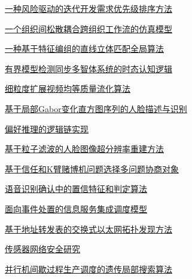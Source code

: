 \documentclass[a4paper]{article}
\begin{document}
\href{http://www.jos.org.cn/ch/reader/download_pdf.aspx?file_no=20061205&year_id=2006&quarter_id=12&falg=1}{一种风险驱动的迭代开发需求优先级排序方法}

\href{http://www.jos.org.cn/ch/reader/download_pdf.aspx?file_no=20061206&year_id=2006&quarter_id=12&falg=1}{一个组织间松散耦合跨组织工作流的仿真模型}

\href{http://www.jos.org.cn/ch/reader/download_pdf.aspx?file_no=20061207&year_id=2006&quarter_id=12&falg=1}{一种基于特征编组的直线立体匹配全局算法}

\href{http://www.jos.org.cn/ch/reader/download_pdf.aspx?file_no=20061208&year_id=2006&quarter_id=12&falg=1}{有界模型检测同步多智体系统的时态认知逻辑}

\href{http://www.jos.org.cn/ch/reader/download_pdf.aspx?file_no=20061209&year_id=2006&quarter_id=12&falg=1}{细粒度扩展视频均等质量流化算法}

\href{http://www.jos.org.cn/ch/reader/download_pdf.aspx?file_no=20061210&year_id=2006&quarter_id=12&falg=1}{基于局部Gabor变化直方图序列的人脸描述与识别}

\href{http://www.jos.org.cn/ch/reader/download_pdf.aspx?file_no=20061211&year_id=2006&quarter_id=12&falg=1}{偏好推理的逻辑链实现}

\href{http://www.jos.org.cn/ch/reader/download_pdf.aspx?file_no=20061212&year_id=2006&quarter_id=12&falg=1}{基于粒子滤波的人脸图像超分辨率重建方法}

\href{http://www.jos.org.cn/ch/reader/download_pdf.aspx?file_no=20061213&year_id=2006&quarter_id=12&falg=1}{基于信任和K臂赌博机问题选择多问题协商对象}

\href{http://www.jos.org.cn/ch/reader/download_pdf.aspx?file_no=20061214&year_id=2006&quarter_id=12&falg=1}{语音识别确认中的置信特征和判定算法}

\href{http://www.jos.org.cn/ch/reader/download_pdf.aspx?file_no=20061215&year_id=2006&quarter_id=12&falg=1}{面向事件处置的信息服务集成调度模型}

\href{http://www.jos.org.cn/ch/reader/download_pdf.aspx?file_no=20061216&year_id=2006&quarter_id=12&falg=1}{基于地址转发表的交换式以太网拓扑发现方法}

\href{http://www.jos.org.cn/ch/reader/download_pdf.aspx?file_no=20061217&year_id=2006&quarter_id=12&falg=1}{传感器网络安全研究}

\href{http://www.jos.org.cn/ch/reader/download_pdf.aspx?file_no=20061218&year_id=2006&quarter_id=12&falg=1}{并行机间歇过程生产调度的遗传局部搜索算法}
\end{document}
